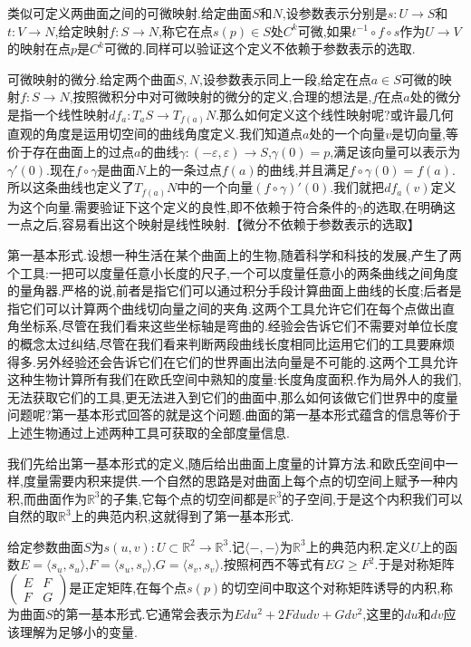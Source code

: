 类似可定义两曲面之间的可微映射.给定曲面$S$和$N$,设参数表示分别是$s:U\to S$和$t:V\to N$,给定映射$f:S\to N$,称它在点$s(p)\in S$处$C^k$可微,如果$t^{-1}\circ f\circ s$作为$U\to V$的映射在点$p$是$C^k$可微的.同样可以验证这个定义不依赖于参数表示的选取.

可微映射的微分.给定两个曲面$S,N$,设参数表示同上一段,给定在点$a\in S$可微的映射$f:S\to N$,按照微积分中对可微映射的微分的定义,合理的想法是,$f$在点$a$处的微分是指一个线性映射$df_a:T_aS\to T_{f(a)}N$.那么如何定义这个线性映射呢?或许最几何直观的角度是运用切空间的曲线角度定义.我们知道点$a$处的一个向量$v$是切向量,等价于存在曲面上的过点$a$的曲线$\gamma:(-\varepsilon,\varepsilon)\to S$,$\gamma(0)=p$,满足该向量可以表示为$\gamma'(0)$.现在$f\circ\gamma$是曲面$N$上的一条过点$f(a)$的曲线,并且满足$f\circ\gamma(0)=f(a)$.所以这条曲线也定义了$T_{f(a)}N$中的一个向量$(f\circ\gamma)'(0)$.我们就把$df_a(v)$定义为这个向量.需要验证下这个定义的良性,即不依赖于符合条件的$\gamma$的选取,在明确这一点之后,容易看出这个映射是线性映射.【微分不依赖于参数表示的选取】

第一基本形式.设想一种生活在某个曲面上的生物,随着科学和科技的发展,产生了两个工具:一把可以度量任意小长度的尺子,一个可以度量任意小的两条曲线之间角度的量角器.严格的说,前者是指它们可以通过积分手段计算曲面上曲线的长度;后者是指它们可以计算两个曲线切向量之间的夹角.这两个工具允许它们在每个点做出直角坐标系,尽管在我们看来这些坐标轴是弯曲的.经验会告诉它们不需要对单位长度的概念太过纠结,尽管在我们看来判断两段曲线长度相同比运用它们的工具要麻烦得多.另外经验还会告诉它们在它们的世界画出法向量是不可能的.这两个工具允许这种生物计算所有我们在欧氏空间中熟知的度量:长度角度面积.作为局外人的我们,无法获取它们的工具,更无法进入到它们的曲面中,那么如何该做它们世界中的度量问题呢?第一基本形式回答的就是这个问题.曲面的第一基本形式蕴含的信息等价于上述生物通过上述两种工具可获取的全部度量信息.

我们先给出第一基本形式的定义,随后给出曲面上度量的计算方法.和欧氏空间中一样,度量需要内积来提供.一个自然的思路是对曲面上每个点的切空间上赋予一种内积,而曲面作为$\mathbb{R}^3$的子集,它每个点的切空间都是$\mathbb{R}^3$的子空间,于是这个内积我们可以自然的取$\mathbb{R}^3$上的典范内积,这就得到了第一基本形式.

给定参数曲面$S$为$s(u,v):U\subset\mathbb{R}^2\to\mathbb{R}^3$.记$\langle -,-\rangle$为$\mathbb{R}^3$上的典范内积.定义$U$上的函数$E=\langle s_u,s_u\rangle$,$F=\langle s_u,s_v\rangle$,$G=\langle s_v,s_v\rangle$.按照柯西不等式有$EG\ge F^2$.于是对称矩阵$\left(\begin{array}{cc} E&F\\ F&G\end{array}\right)$是正定矩阵,在每个点$s(p)$的切空间中取这个对称矩阵诱导的内积,称为曲面$S$的第一基本形式.它通常会表示为$Edu^2+2Fdudv+Gdv^2$,这里的$du$和$dv$应该理解为足够小的变量.

